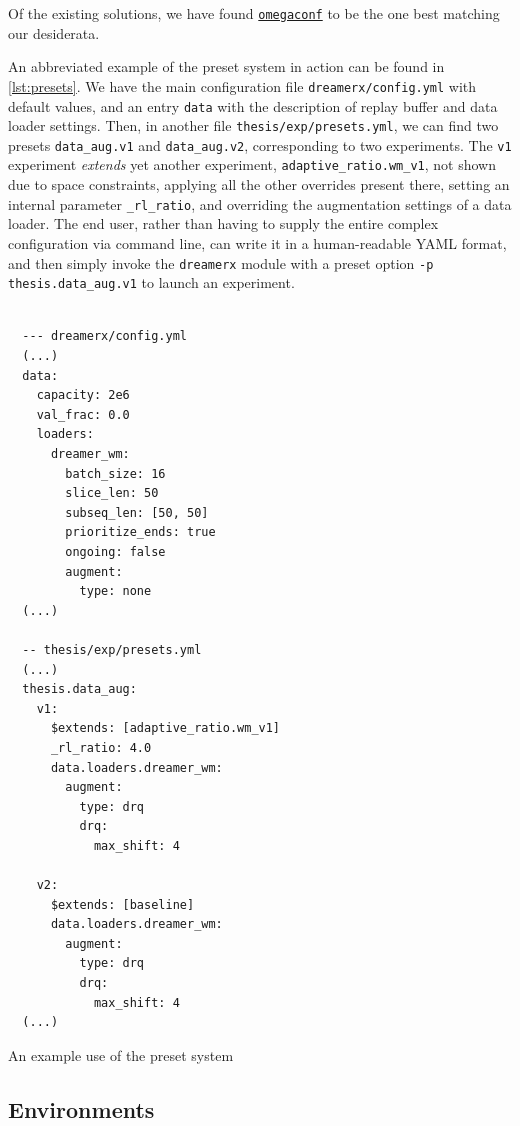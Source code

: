 \documentclass[en]{pracamgr}
\begin{document}
Of the existing solutions, we have found \href{https://omegaconf.readthedocs.io}{\tt omegaconf} to be the one best matching our desiderata.

\begin{sloppypar}
  An abbreviated example of the preset system in action can be found in \autoref{lst:presets}. We have the main configuration file {\tt dreamerx/config.yml} with default values, and an entry {\tt data} with the description of replay buffer and data loader settings. Then, in another file {\tt thesis/exp/presets.yml}, we can find two presets {\tt data\_aug.v1} and {\tt data\_aug.v2}, corresponding to two experiments. The {\tt v1} experiment \emph{extends} yet another experiment, {\tt adaptive\_ratio.wm\_v1}, not shown due to space constraints, applying all the other overrides present there, setting an internal parameter {\tt \_rl\_ratio}, and overriding the augmentation settings of a data loader. The end user, rather than having to supply the entire complex configuration via command line, can write it in a human-readable YAML format, and then simply invoke the {\tt dreamerx} module with a preset option {\tt -p thesis.data\_aug.v1} to launch an experiment.
\end{sloppypar}

\begin{listing}
  \begin{verbatim}

  --- dreamerx/config.yml
  (...)
  data:
    capacity: 2e6
    val_frac: 0.0
    loaders:
      dreamer_wm:
        batch_size: 16
        slice_len: 50
        subseq_len: [50, 50]
        prioritize_ends: true
        ongoing: false
        augment:
          type: none
  (...)

  -- thesis/exp/presets.yml
  (...)
  thesis.data_aug:
    v1:
      $extends: [adaptive_ratio.wm_v1]
      _rl_ratio: 4.0
      data.loaders.dreamer_wm:
        augment:
          type: drq
          drq:
            max_shift: 4

    v2:
      $extends: [baseline]
      data.loaders.dreamer_wm:
        augment:
          type: drq
          drq:
            max_shift: 4
  (...)
  \end{verbatim}
  \caption{An example use of the preset system}
  \label{lst:presets}
\end{listing}

\subsection{Environments}
\end{document}
